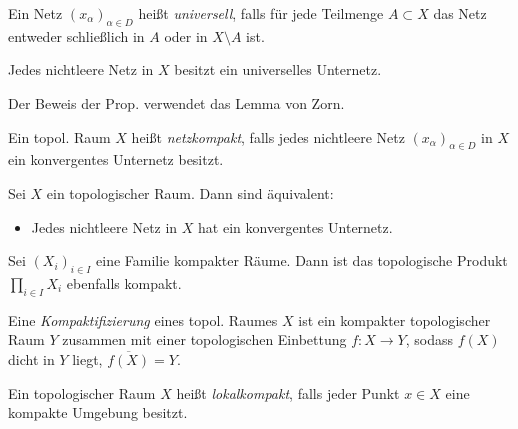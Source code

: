 \documentclass{cheat-sheet}
\begin{document}

\begin{defn}
  Ein Netz $(x_\alpha)_{\alpha \in D}$ heißt \emph{universell}, falls für jede Teilmenge $A \subset X$ das Netz entweder schließlich in $A$ oder in $X \setminus A$ ist.
\end{defn}


\begin{prop}
  Jedes nichtleere Netz in $X$ besitzt ein universelles Unternetz.
\end{prop}

\begin{bem}
  Der Beweis der Prop. verwendet das Lemma von Zorn.
\end{bem}

\begin{defn}
  Ein topol. Raum $X$ heißt \emph{netzkompakt}, falls jedes nichtleere Netz $(x_\alpha)_{\alpha \in D}$ in $X$ ein konvergentes Unternetz besitzt.
\end{defn}

\begin{satz}
  Sei $X$ ein topologischer Raum. Dann sind äquivalent:
  \begin{itemize}
    \item Jedes nichtleere Netz in $X$ hat ein konvergentes Unternetz.
  \end{itemize}
\end{satz}

\begin{satz}
  Sei $(X_i)_{i \in I}$ eine Familie kompakter Räume. Dann ist das topologische Produkt $\prod_{i \in I} X_i$ ebenfalls kompakt.
\end{satz}


\begin{defn}
  Eine \emph{Kompaktifizierung} eines topol. Raumes $X$ ist ein kompakter topologischer Raum $Y$ zusammen mit einer topologischen Einbettung $f : X \to Y$, sodass $f(X)$ dicht in $Y$ liegt, \dh{} $\overline{f(X)} = Y$.
\end{defn}

\begin{defn}
  Ein topologischer Raum $X$ heißt \emph{lokalkompakt}, falls jeder Punkt $x \in X$ eine kompakte Umgebung besitzt.
\end{defn}
\end{document}
